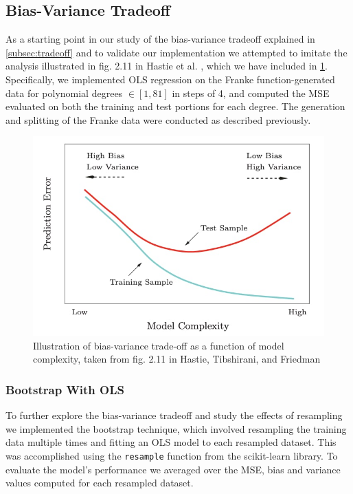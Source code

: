 \documentclass[aps,pra,english,notitlepage,reprint,nofootinbib]{revtex4-1}  %
\begin{document}
\subsection{Bias-Variance Tradeoff}
As a starting point in our study of the bias-variance tradeoff explained in \cref{subsec:tradeoff} and to validate our implementation we attempted to imitate the analysis illustrated in fig. 2.11 in Hastie et al. \cite{ESL}, which we have included in \cref{fig:Hastie}. Specifically, we implemented OLS regression on the Franke function-generated data for polynomial degrees $\in[1,81]$ in steps of 4, and computed the MSE evaluated on both the training and test portions for each degree. The generation and splitting of the Franke data were conducted as described previously. 

\begin{figure}
  \centering %
  \includegraphics[width=\columnwidth]{../figs/hastie_bias_variance_tradeoff.jpg}
  \caption{Illustration of bias-variance trade-off as a function of model complexity, taken from fig. 2.11 in Hastie, Tibshirani, and Friedman \cite{ESL}}\label{fig:Hastie}
\end{figure}

\subsubsection{Bootstrap With OLS}
To further explore the bias-variance tradeoff and study the effects of resampling we implemented the bootstrap technique, which involved resampling the training data multiple times and fitting an OLS model to each resampled dataset. This was accomplished using the \verb|resample| function from the scikit-learn library. To evaluate the model's performance we averaged over the MSE, bias and variance values computed for each resampled dataset.
\end{document}
